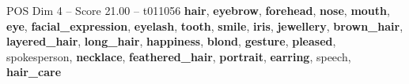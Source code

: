 \begin{textsample}{POS Dim 4 – Score 21.00 – t011056}  \label{ex:f4_pos_017}
\textbf{hair}, \textbf{eyebrow}, \textbf{forehead}, \textbf{nose}, \textbf{mouth}, \textbf{eye}, \textbf{facial\_expression}, \textbf{eyelash}, \textbf{tooth}, \textbf{smile}, \textbf{iris}, \textbf{jewellery}, \textbf{brown\_hair}, \textbf{layered\_hair}, \textbf{long\_hair}, \textbf{happiness}, \textbf{blond}, \textbf{gesture}, \textbf{pleased}, spokesperson, \textbf{necklace}, \textbf{feathered\_hair}, \textbf{portrait}, \textbf{earring}, speech, \textbf{hair\_care}

\end{textsample}
